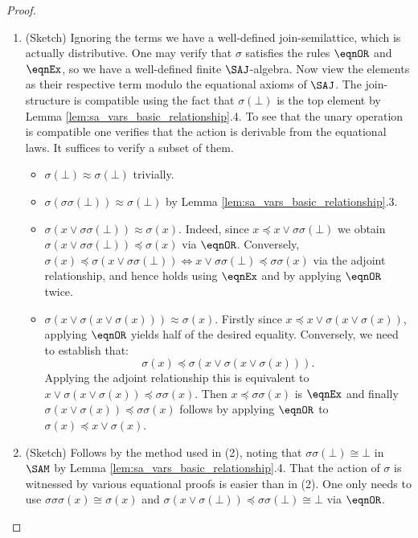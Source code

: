 \documentclass{article}
\begin{document}
\begin{proof}
\begin{enumerate}
\item
(Sketch) Ignoring the terms we have a well-defined join-semilattice, which is actually distributive. One may verify that $\sigma$ satisfies the rules $\eqnOR$ and $\eqnEx$, so we have a well-defined finite $\SAJ$-algebra. Now view the elements as their respective term modulo the equational axioms of $\SAJ$. The join-structure is compatible using the fact that $\sigma(\bot)$ is the top element by Lemma \ref{lem:sa_vars_basic_relationship}.4. To see that the unary operation is compatible one verifies that the action is derivable from the equational laws. It suffices to verify a subset of them.
\begin{itemize}
\item
$\sigma(\bot) \approx \sigma(\bot)$ trivially.
\item
$\sigma(\sigma\sigma(\bot)) \approx \sigma(\bot)$ by Lemma \ref{lem:sa_vars_basic_relationship}.3.
\item
$\sigma(x \lor \sigma\sigma(\bot)) \approx \sigma(x)$. Indeed, since $x \preccurlyeq x \lor \sigma\sigma(\bot)$ we obtain $\sigma(x \lor \sigma\sigma(\bot)) \preccurlyeq \sigma(x)$ via $\eqnOR$. Conversely, $\sigma(x) \preccurlyeq \sigma(x \lor \sigma\sigma(\bot)) \iff x \lor \sigma\sigma(\bot) \preccurlyeq \sigma\sigma(x)$ via the adjoint relationship, and hence holds using $\eqnEx$ and by applying $\eqnOR$ twice.

\item
$\sigma(x \lor \sigma(x \lor \sigma(x))) \approx \sigma(x)$. Firstly since $x \preccurlyeq x \lor \sigma(x \lor \sigma(x))$, applying $\eqnOR$ yields half of the desired equality. Conversely, we need to establish that:
\[
\sigma(x)
\preccurlyeq
\sigma(x \lor \sigma(x \lor \sigma(x))).
\]
Applying the adjoint relationship this is equivalent to $x \lor \sigma(x \lor \sigma(x)) \preccurlyeq \sigma\sigma(x)$. Then $x \preccurlyeq \sigma\sigma(x)$ is $\eqnEx$ and finally $\sigma(x \lor \sigma(x)) \preccurlyeq \sigma\sigma(x)$ follows by applying $\eqnOR$ to $\sigma(x) \preccurlyeq x \lor \sigma(x)$.

\end{itemize}

\item
(Sketch) Follows by the method used in (2), noting that $\sigma\sigma(\bot) \cong \bot$ in $\SAM$ by Lemma \ref{lem:sa_vars_basic_relationship}.4. That the action of $\sigma$ is witnessed by various equational proofs is easier than in (2). One only needs to use $\sigma\sigma\sigma(x) \cong \sigma(x)$ and $\sigma(x \lor \sigma(\bot)) \preccurlyeq \sigma\sigma(\bot) \cong \bot$ via $\eqnOR$.

\end{enumerate}
\end{proof}
\end{document}

